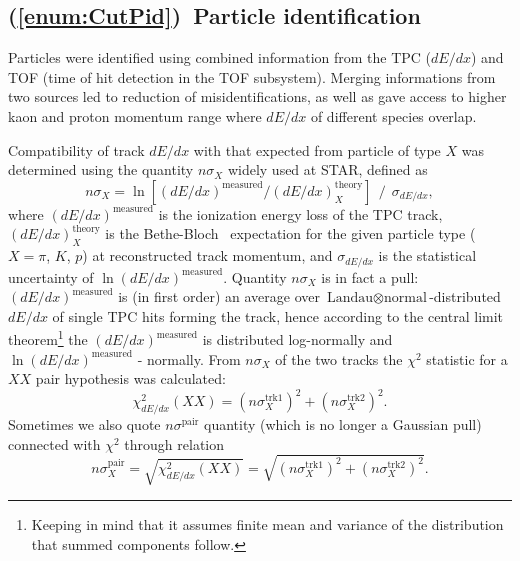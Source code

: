 \subsection{(\ref{enum:CutPid})~Particle identification}\label{subsec:pidCuts}

Particles were identified using combined information from the TPC ($dE/dx$) and TOF (time of hit detection in the TOF subsystem). Merging informations from two sources led to reduction of misidentifications, as well as gave access to higher kaon and proton momentum range where $dE/dx$ of different species overlap.

Compatibility of track $dE/dx$ with that expected from particle of type $X$ was determined using the quantity $n\sigma_{X}$ widely used at STAR, defined as
\protect \begin{equation}\label{eq:nSigmaDef} n\sigma_{X} =  \ln{\left[(dE/dx)^\text{measured} / (dE/dx)_{X}^\text{theory}\right]}~~/~~\sigma_{dE/dx}, \end{equation}
%
where $(dE/dx)^\text{measured}$ is the ionization energy loss of the TPC track, $(dE/dx)_{X}^\text{theory}$ is the Bethe-Bloch~\cite{Bichsel} expectation for the given particle type ($X=\pi$, $K$, $p$) at reconstructed track momentum, and $\sigma_{dE/dx}$ is the statistical uncertainty of $\ln{(dE/dx)^\text{measured}}$. Quantity $n\sigma_{X}$ is in fact a pull: $(dE/dx)^\text{measured}$ is (in first order) an average over $\text{Landau}\otimes\text{normal}$-distributed $dE/dx$ of single TPC hits forming the track, hence according to the central limit theorem\footnote{Keeping in mind that it assumes finite mean and variance of the distribution that summed components follow.} the $(dE/dx)^\text{measured}$ is distributed log-normally and $\ln{(dE/dx)^\text{measured}}$ - normally. From $n\sigma_{X}$ of the two tracks the $\chi^{2}$ statistic for a $XX$ pair hypothesis was calculated:
%
\begin{equation}\label{eq:chiSqDef}\chi^{2}_{dE/dx}(XX) = \left(n\sigma_{X}^{\text{trk1}}\right)^{2} + \left(n\sigma_{X}^{\text{trk2}}\right)^{2}.\end{equation}
%
Sometimes we also quote $n\sigma^{\text{pair}}$ quantity (which is no longer a Gaussian pull) connected with $\chi^{2}$ through relation
%
\begin{equation}\label{eq:nSigmaPairDef}n\sigma^{\text{pair}}_{X} = \sqrt{\chi^{2}_{dE/dx}(XX)} = \sqrt{\left(n\sigma_{X}^{\text{trk1}}\right)^{2} + \left(n\sigma_{X}^{\text{trk2}}\right)^{2}}.\end{equation}

